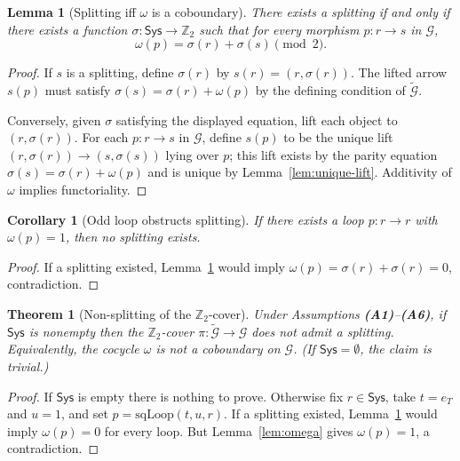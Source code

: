 \documentclass[aps,prl,reprint]{revtex4-2}
\newcommand{\Sys}{\mathsf{Sys}}
\newcommand{\Ztwo}{\mathbb{Z}_2}
\theoremstyle{definition}
\theoremstyle{plain}
\newtheorem{lemma}{Lemma}[section]
\newtheorem{theorem}{Theorem}[section]
\newtheorem{corollary}{Corollary}[section]
\begin{document}
\begin{lemma}[Splitting iff $\omega$ is a coboundary]
\label{lem:split-cob}
There exists a splitting if and only if there exists a function
$\sigma:\Sys\to\Ztwo$ such that for every morphism $p:r\to s$ in $\mathcal G$,
\[\omega(p)=\sigma(r)+\sigma(s)\pmod 2.\]

\end{lemma}

\begin{proof}
If $s$ is a splitting, define $\sigma(r)$ by $s(r)=(r,\sigma(r))$. The lifted arrow
$s(p)$ must satisfy $\sigma(s)=\sigma(r)+\omega(p)$ by the defining condition of
$\widetilde{\mathcal G}$.

Conversely, given $\sigma$ satisfying the displayed equation, lift each object to
$(r,\sigma(r))$. For each $p:r\to s$ in $\mathcal G$, define $s(p)$ to be the unique lift
$(r,\sigma(r))\to(s,\sigma(s))$ lying over $p$; this lift exists by the parity
equation $\sigma(s)=\sigma(r)+\omega(p)$ and is unique by Lemma~\ref{lem:unique-lift}.
Additivity of $\omega$ implies functoriality.
\end{proof}

\begin{corollary}[Odd loop obstructs splitting]
\label{cor:odd-loop}
If there exists a loop $p:r\to r$ with $\omega(p)=1$, then no splitting exists.

\end{corollary}

\begin{proof}
If a splitting existed, Lemma~\ref{lem:split-cob} would imply
$\omega(p)=\sigma(r)+\sigma(r)=0$, contradiction.
\end{proof}

\begin{theorem}[Non-splitting of the $\Ztwo$-cover]
\label{thm:non-splitting}
Under Assumptions \textbf{(A1)}--\textbf{(A6)}, if $\Sys$ is nonempty then the $\Ztwo$-cover
$\pi:\widetilde{\mathcal G}\to\mathcal G$ does not admit a splitting.
Equivalently, the cocycle $\omega$ is not a coboundary on $\mathcal G$.
(If $\Sys=\emptyset$, the claim is trivial.)

\end{theorem}

\begin{proof}
If $\Sys$ is empty there is nothing to prove. Otherwise fix $r\in\Sys$, take $t=e_T$
and $u=1$, and set $p=\mathrm{sqLoop}(t,u,r)$. If a splitting existed,
Lemma~\ref{lem:split-cob} would imply $\omega(p)=0$ for every loop.
But Lemma~\ref{lem:omega} gives $\omega(p)=1$, a contradiction.
\end{proof}
\end{document}
